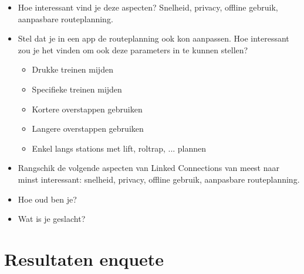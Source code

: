\begin{appendices}
\begin{itemize}
	\item Hoe interessant vind je deze aspecten? Snelheid, privacy, offline gebruik, aanpasbare routeplanning.
	\item Stel dat je in een app de routeplanning ook kon aanpassen. Hoe interessant zou je het vinden om ook deze parameters in te kunnen stellen?
	\begin{itemize}
		\item 	Drukke treinen mijden
		\item 	Specifieke treinen mijden
		\item 	Kortere overstappen gebruiken	
		\item 	Langere overstappen gebruiken
		\item 	Enkel langs stations met lift, roltrap, ... plannen
	\end{itemize}
	\item Rangschik de volgende aspecten van Linked Connections van meest naar minst interessant: snelheid, privacy, offline gebruik, aanpasbare routeplanning.
	\item Hoe oud ben je?
	\item Wat is je geslacht?
\end{itemize}

\chapter{Resultaten enquete}
\label{appendix:report}


\end{appendices}